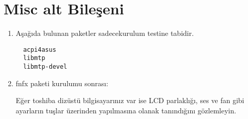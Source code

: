 \documentclass[a4paper,10pt]{article}
\begin{document}
\section{Misc alt Bileşeni}
\begin{enumerate}
 \item Aşağıda bulunan paketler sadecekurulum testine tabidir.
\begin{verbatim}
  acpi4asus
  libmtp
  libmtp-devel
\end{verbatim}

\item fnfx paketi kurulumu sonrası:

Eğer toshiba dizüstü bilgisayarınız var ise LCD parlaklığı, ses ve fan gibi ayarların tuşlar üzerinden yapılmasına olanak tanındığını gözlemleyin.
\end{enumerate}
\end{document}
